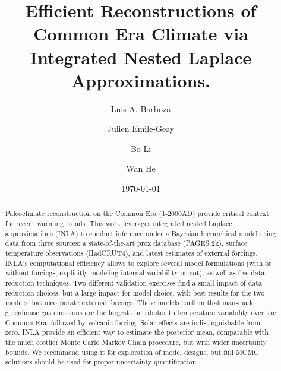\documentclass[12pt]{amsart}
\theoremstyle{plain}
\theoremstyle{definition}
\theoremstyle{remark}
\begin{document}
\doublespacing
\title[]{Efficient Reconstructions of Common Era Climate via Integrated Nested Laplace Approximations.}

\author[]{Luis A. Barboza}
\address{Centro de Investigacion en Matematica Pura y Aplicada (CIMPA)-Escuela
  de Matematica, Universidad de Costa Rica\\
San Jos\'e, Costa Rica}


\author[]{Julien Emile-Geay}
\address{Department of Earth Sciences \\
  University of Southern California \\
  Los Angeles, California, USA.
}


\author[]{Bo Li}
\address{Department of Statistics \\
  University of Illinois at Urbana-Champaign \\
  Champaign, Illinois, USA.
}

\author[]{Wan He}

\date{\today}
\subjclass[2010]{}
\maketitle

\begin{abstract}
Paleoclimate reconstruction on the Common Era (1-2000AD) provide critical context for recent warming trends. This work leverages integrated nested Laplace approximations (INLA) to conduct inference under a Bayesian hierarchical model using data from three sources: a state-of-the-art prox database (PAGES 2k), surface temperature observations (HadCRUT4), and latest estimates of external forcings. 
INLA's computational efficiency allows to explore several model formulations (with or without forcings, explicitly modeling internal variability or not), as well as five data reduction techniques. Two different validation exercises find a small impact of data reduction choices, but a large impact for model choice, with best results for the two models that incorporate external forcings. These models confirm that man-made greenhouse gas emissions are the largest contributor to temperature variability over the Common Era, followed by volcanic forcing. Solar effects are indistinguishable from zero. INLA provide an efficient way to estimate the posterior mean, comparable with the much costlier Monte Carlo Markov Chain procedure, but with wider uncertainty bounds. We recommend using it for exploration of model designs, but full MCMC solutions should be used for proper uncertainty quantification.  
\end{abstract}
\end{document}
